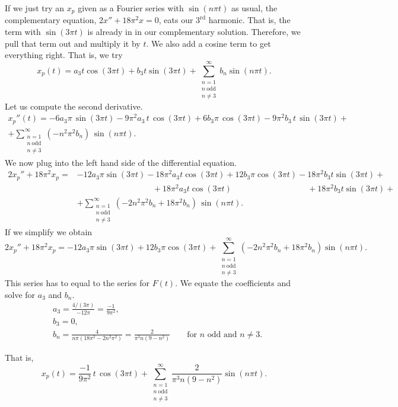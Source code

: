 \begin{example}
If we just try an $x_p$ given as a Fourier series with $\sin (n\pi t)$ as usual,
the complementary equation, $2x''+18\pi^2x=0$, eats our $3^\text{rd}$ harmonic.  That is, the term
with $\sin(3 \pi t)$
is already in
in our complementary solution.
Therefore, we pull that term out and
multiply it by $t$.  We also add a cosine term to get everything right.
That is, we try
\begin{equation*}
x_p(t) =
a_3
t \cos (3 \pi t )
+
b_3
t \sin (3 \pi t)
+
\sum_{\substack{n=1 \\ n~\text{odd} \\ n\not= 3}}^\infty
b_n
\sin (n \pi t) . 
\end{equation*}
Let us compute the second derivative.
\begin{multline*}
x_p''(t) =
- 6 a_3
\pi \, \sin (3 \pi t) - 9\pi^2 a_3 \, t \, \cos (3 \pi t)
+
6 b_3
\pi \, \cos (3 \pi t) - 9\pi^2 b_3 \, t \, \sin (3 \pi t)
+
\\
+
\sum_{\substack{n=1 \\ n~\text{odd} \\ n\not= 3}}^\infty
(-n^2 \pi^2 b_n ) \,
\sin (n \pi t) . 
\end{multline*}
We now plug into the left hand side of the differential equation.
\begin{align*}
2x_p'' + 18\pi^2 x_p = & 
- 12 a_3 \pi \sin (3 \pi t)
- 18\pi^2 a_3 t \cos (3 \pi t)
+ 12 b_3 \pi \cos (3 \pi t)
- 18\pi^2 b_3 t \sin (3 \pi t)
+
\\
& \phantom{\, - 12 a_3 \pi \sin (3 \pi t)} ~
+ 18 \pi^2 a_3 t \cos (3 \pi t)
\phantom{\, + 12 b_3 \pi \cos (3 \pi t)} ~
+ 18 \pi^2 b_3 t \sin (3 \pi t)
+
\\
& + \sum_{\substack{n=1 \\ n~\text{odd} \\ n\not= 3}}^\infty
(-2n^2 \pi^2 b_n + 18\pi^2 b_n) \,
\sin (n \pi t) . 
\end{align*}
If we simplify we obtain
\begin{equation*}
2x_p'' + 18\pi^2 x_p =
- 12 a_3
\pi \sin (3 \pi t)
+
12 b_3
\pi \cos (3 \pi t)
+
\sum_{\substack{n=1 \\ n~\text{odd} \\ n\not= 3}}^\infty
(-2n^2 \pi^2 b_n + 18\pi^2 b_n)
\sin (n \pi t) . 
\end{equation*}
This series has to equal to the series for $F(t)$.
We equate the coefficients and solve for $a_3$ and $b_n$.
\begin{align*}
& a_3 = \frac{4/(3\pi)}{-12\pi} = \frac{-1}{9\pi^2} , \\
& b_3 = 0 , \\
& b_n = \frac{4}{n\pi(18\pi^2 - 2n^2 \pi^2)} 
= \frac{2}{\pi^3 n(9 - n^2)} \qquad \text{for } n \text{ odd and } n\not=3 .
\end{align*}

That is,
\begin{equation*}
x_p(t) =
\frac{-1}{9\pi^2}
\,
t \, \cos (3 \pi t)
+
\sum_{\substack{n=1 \\ n~\text{odd} \\ n\not= 3}}^\infty
\frac{2}{\pi^3 n(9 - n^2)}
\sin (n \pi t) . 
\end{equation*}
\end{example}

